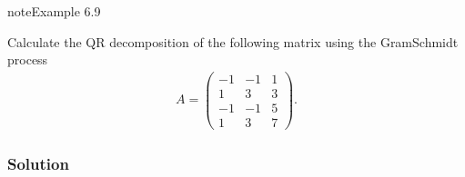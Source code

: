 \documentclass[letterpaper,10pt,english]{jupyterBook}
\begin{document}
\begin{sphinxadmonition}{note}{Example 6.9}

\sphinxAtStartPar
Calculate the QR decomposition of the following matrix using the Gram\sphinxhyphen{}Schmidt process
\begin{align*}
    A  = \begin{pmatrix}
        -1 & -1 & 1 \\
        1 & 3 & 3 \\
        -1 & -1 & 5 \\
        1 & 3 & 7
    \end{pmatrix}.
\end{align*}\subsubsection*{Solution}


\end{sphinxadmonition}
\end{document}
